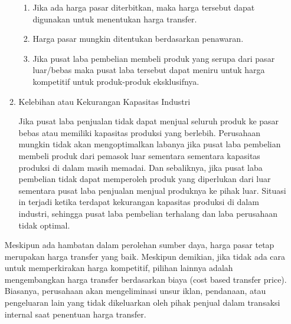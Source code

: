 \begin{enumerate}
\begin{enumerate}
		\begin{enumerate}
			\item Jika ada harga pasar diterbitkan, maka harga tersebut dapat digunakan untuk menentukan harga transfer.
			\item Harga pasar mungkin ditentukan berdasarkan penawaran.
			\item Jika pusat laba pembelian membeli produk yang serupa dari pasar luar/bebas maka pusat laba tersebut dapat meniru untuk harga kompetitif untuk produk-produk eksklusifnya.
		\end{enumerate}

		\item Kelebihan atau Kekurangan Kapasitas Industri
		
		Jika pusat laba penjualan tidak dapat menjual seluruh produk ke pasar bebas atau memiliki kapasitas produksi yang berlebih. Perusahaan mungkin tidak akan mengoptimalkan labanya jika pusat laba pembelian membeli produk dari pemasok luar sementara sementara kapasitas produksi di dalam masih memadai. Dan sebaliknya, jika pusat laba pembelian tidak dapat memperoleh produk yang diperlukan dari luar sementara pusat laba penjualan menjual produknya ke pihak luar. Situasi in terjadi ketika terdapat kekurangan kapasitas produksi di dalam industri, sehingga pusat laba pembelian terhalang dan laba perusahaan tidak optimal.
	\end{enumerate}

	Meskipun ada hambatan dalam perolehan sumber daya, harga pasar tetap merupakan harga transfer yang baik. Meskipun demikian, jika tidak ada cara untuk memperkirakan harga kompetitif, pilihan lainnya adalah mengembangkan harga transfer berdasarkan biaya (cost based transfer price). Biasanya, perusahaan akan mengeliminasi unsur iklan, pendanaan, atau pengeluaran lain yang tidak dikeluarkan oleh pihak penjual dalam transaksi internal saat penentuan harga transfer.

\end{enumerate}



	
